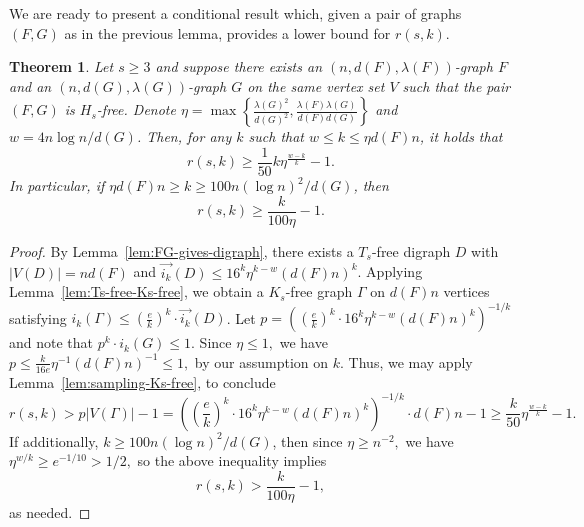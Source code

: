\documentclass{article}
\theoremstyle{plain}
\newtheorem{theorem}{Theorem}[section]
\theoremstyle{definition}
\newcommand{\fwi}[1]{\overrightarrow{i_{#1}}}
\begin{document}
We are ready to present a conditional result which, given a pair of graphs $(F, G)$ as in the previous lemma, provides a lower bound for $r(s,k)$.
\begin{theorem} \label{thm:ramsey-from-FG}
    Let $s \ge 3$ and suppose there exists an $(n, d(F), \lambda(F))$-graph $F$ and an $(n, d(G), \lambda(G))$-graph $G$ on the same vertex set $V$ such that the pair $(F, G)$ is $H_s$-free. Denote $\eta = \max\left\{ \frac{\lambda(G)^2}{d(G)^2}, \frac{\lambda(F) \lambda(G)}{d(F) d(G)} \right\}$ and $w = 4 n \log n / d(G)$. Then, for any $k$ such that $w \le k \le \eta d(F) n$, it holds that
    \[ r(s, k) \ge \frac{1}{50} k \eta^{\frac{w-k}{k}} - 1. \]
    In particular, if $\eta d(F) n \ge k \ge 100 n (\log n)^2 / d(G)$, then
    \[ r(s, k) \ge \frac{k}{100 \eta} - 1. \]
\end{theorem}
\begin{proof}
    By Lemma~\ref{lem:FG-gives-digraph}, there exists a $T_s$-free digraph $D$ with $|V(D)| = n d(F)$ and $\fwi{k}(D) \le 16^k \eta^{k - w} (d(F) n)^k$. Applying Lemma~\ref{lem:Ts-free-Ks-free}, we obtain a $K_s$-free graph $\Gamma$ on $d(F) n$ vertices satisfying $i_k(\Gamma) \le \left(\frac{e}{k}\right)^k \cdot \fwi{k}(D)$. Let $p = \left( \left(\frac{e}{k}\right)^k \cdot 16^k \eta^{k - w} (d(F) n)^k \right)^{-1/k}$ and note that $p^k \cdot i_k(G) \le 1$. Since $\eta \le 1,$ we have $p \le \frac{k}{16e} \eta^{-1} (d(F) n)^{-1} \le 1,$ by our assumption on $k$. Thus, we may apply Lemma~\ref{lem:sampling-Ks-free}, to conclude
    \[ r(s, k) > p |V(\Gamma)| - 1 = \left( \left(\frac{e}{k}\right)^k \cdot 16^k \eta^{k - w} (d(F) n)^k \right)^{-1/k}  \cdot d(F) n - 1 \ge \frac{k}{50} \eta^{\frac{w-k}{k}} - 1. \]
    If additionally, $k \ge 100 n (\log n)^2 / d(G)$, then since $\eta \ge n^{-2},$ we have $\eta^{w/k} \ge e^{-1/10} > 1/2,$ so the above inequality implies
    \[ r(s,k) > \frac{k}{100 \eta} - 1, \]
    as needed.
\end{proof}
\end{document}
